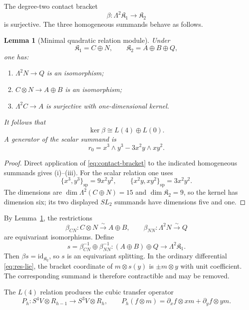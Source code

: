 \documentclass[11pt]{article}
\theoremstyle{plain}
\newtheorem{lemma}[lemma]{Lemma}
\theoremstyle{definition}
\theoremstyle{remark}
\numberwithin{equation}{section}
\newcommand{\Kalg}{\mathfrak K}
\newcommand{\spb}{\mathrm{sp}}
\begin{document}
The degree-two contact bracket
\[
 \beta:\Lambda^2\Kalg_1\longrightarrow\Kalg_2
\]
is surjective.  The three homogeneous summands behave as follows.

\begin{lemma}[Minimal quadratic relation module]\label{lem:quadratic-kernel}
Under
\[
 \Kalg_1=C\oplus N,
 \qquad
 \Kalg_2=A\oplus B\oplus Q,
\]
one has:
\begin{enumerate}[label=\textup{(\roman*)}]
\item $\Lambda^2N\to Q$ is an isomorphism;
\item $C\otimes N\to A\oplus B$ is an isomorphism;
\item $\Lambda^2C\to A$ is surjective with one-dimensional kernel.
\end{enumerate}
It follows that
\[
 \ker\beta\cong L(4)\oplus L(0).
\]
A generator of the scalar summand is
\begin{equation}\label{eq:r0}
 r_0=x^3\wedge y^3-3x^2y\wedge xy^2.
\end{equation}
\end{lemma}

\begin{proof}
Direct application of \eqref{eq:contact-bracket} to the indicated homogeneous summands gives (i)--(iii).  For the scalar relation one uses
\[
 \{x^3,y^3\}_{\spb}=9x^2y^2,
 \qquad
 \{x^2y,xy^2\}_{\spb}=3x^2y^2.
\]
The dimensions are $\dim\Lambda^2(C\oplus N)=15$ and $\dim\Kalg_2=9$, so the kernel has
dimension six; its two displayed $SL_2$ summands have dimensions five and one.
\end{proof}

By Lemma~\ref{lem:quadratic-kernel}, the restrictions
\[
 \beta_{CN}:C\otimes N\xrightarrow{\sim}A\oplus B,
 \qquad
 \beta_{NN}:\Lambda^2N\xrightarrow{\sim}Q
\]
are equivariant isomorphisms.  Define
\begin{equation}\label{eq:explicit-bracket-section}
 s
 =\beta_{CN}^{-1}\oplus\beta_{NN}^{-1}:
 (A\oplus B)\oplus Q\longrightarrow\Lambda^2\Kalg_1.
\end{equation}
Then $\beta s=\mathrm{id}_{\Kalg_2}$, so $s$ is an equivariant splitting.
In the ordinary differential \eqref{eq:res-lie}, the bracket
coordinate of $m\otimes s(y)$ is $\pm m\otimes y$ with unit coefficient.  The corresponding
summand is therefore contractible and may be removed.

The $L(4)$ relation produces the cubic transfer operator
\begin{equation}\label{eq:Ph}
 P_h:S^4V\otimes R_{h-1}\longrightarrow S^3V\otimes R_h,
 \qquad
 P_h(f\otimes m)
 =\partial_xf\otimes xm+\partial_yf\otimes ym.
\end{equation}
\end{document}
